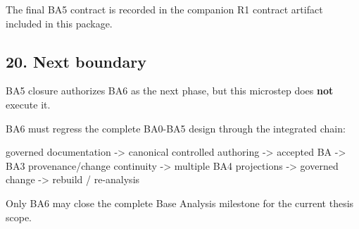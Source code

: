 \documentclass[
  10pt,
  a4paper,
]{article}
\newenvironment{Shaded}{}{}
\newcommand{\NormalTok}[1]{#1}
\begin{document}
The final BA5 contract is recorded in the companion R1 contract artifact
included in this package.

\subsection{20. Next boundary}\label{20-next-boundary}

BA5 closure authorizes BA6 as the next phase, but this microstep does
\textbf{not} execute it.

BA6 must regress the complete BA0-BA5 design through the integrated
chain:

\begin{Shaded}
\begin{Highlighting}[]
\NormalTok{governed documentation}
\NormalTok{ {-}\textgreater{} canonical controlled authoring}
\NormalTok{ {-}\textgreater{} accepted BA}
\NormalTok{ {-}\textgreater{} BA3 provenance/change continuity}
\NormalTok{ {-}\textgreater{} multiple BA4 projections}
\NormalTok{ {-}\textgreater{} governed change}
\NormalTok{ {-}\textgreater{} rebuild / re{-}analysis}
\end{Highlighting}
\end{Shaded}

Only BA6 may close the complete Base Analysis milestone for the current
thesis scope.
\end{document}
